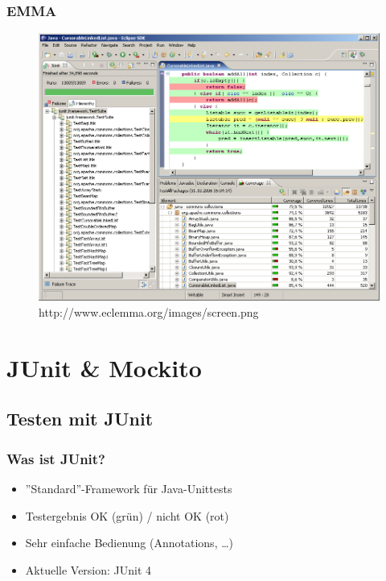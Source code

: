 \documentclass{beamer}
\begin{document}
			\begin{frame}
				\frametitle{EMMA}

				\begin{figure}[htb]
					\begin{center}
						\includegraphics[scale=0.25]{images/eclemma}
					\end{center}
					\caption{http://www.eclemma.org/images/screen.png}
				\end{figure}
			\end{frame}

	
	\section{JUnit \& Mockito}

		\subsection{Testen mit JUnit}

			\begin{frame}
				\frametitle{Was ist JUnit?}

				\begin{itemize}
					\item{''Standard''-Framework für Java-Unittests}
					\item{Testergebnis OK (grün) / nicht OK (rot)}
					\item{Sehr einfache Bedienung (Annotations, \ldots)}
					\item{Aktuelle Version: JUnit 4}
				\end{itemize}
			\end{frame}
\end{document}
